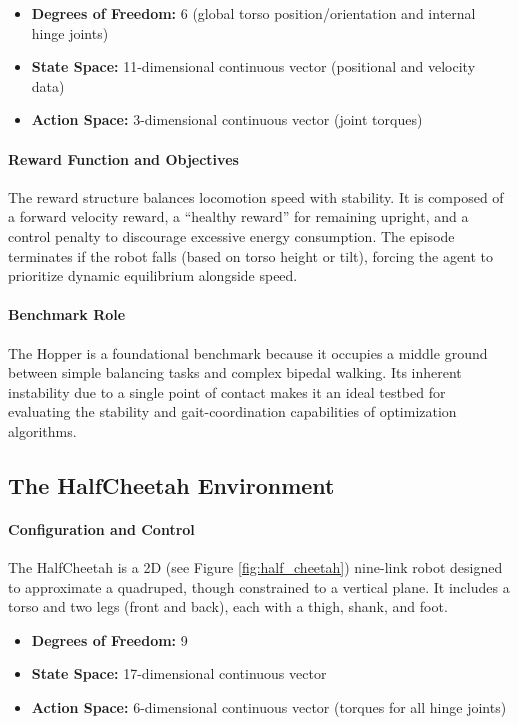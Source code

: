 \begin{itemize}
    \item \textbf{Degrees of Freedom:} 6 (global torso position/orientation and internal hinge joints)
    \item \textbf{State Space:} 11-dimensional continuous vector (positional and velocity data)
    \item \textbf{Action Space:} 3-dimensional continuous vector (joint torques)
\end{itemize}

\paragraph{Reward Function and Objectives} 
The reward structure balances locomotion speed with stability. It is composed of a forward velocity reward, a ``healthy reward'' for remaining upright, and a control penalty to discourage excessive energy consumption. The episode terminates if the robot falls (based on torso height or tilt), forcing the agent to prioritize dynamic equilibrium alongside speed.

\paragraph{Benchmark Role} 
The Hopper is a foundational benchmark because it occupies a middle ground between simple balancing tasks and complex bipedal walking. Its inherent instability due to a single point of contact makes it an ideal testbed for evaluating the stability and gait-coordination capabilities of optimization algorithms.
%
\subsection{The HalfCheetah Environment}

\paragraph{Configuration and Control} 
The HalfCheetah is a 2D (see Figure \ref{fig:half_cheetah}) nine-link robot designed to approximate a quadruped, though constrained to a vertical plane. It includes a torso and two legs (front and back), each with a thigh, shank, and foot.

\begin{itemize}
    \item \textbf{Degrees of Freedom:} 9
    \item \textbf{State Space:} 17-dimensional continuous vector
    \item \textbf{Action Space:} 6-dimensional continuous vector (torques for all hinge joints)
\end{itemize}

